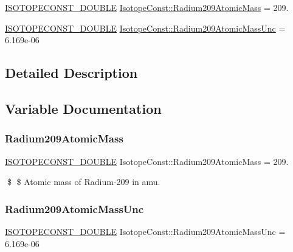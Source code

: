 \begin{DoxyCompactItemize}
\item 
\mbox{\hyperlink{group___isotope_const-_macros_ga8f45a7272ce02c0b4c65c44636ed719a}{I\+S\+O\+T\+O\+P\+E\+C\+O\+N\+S\+T\+\_\+\+D\+O\+U\+B\+LE}} \mbox{\hyperlink{group___isotope_const-_radium-_ra209_ga96427609bbf0950b8395b9c7e150998f}{Isotope\+Const\+::\+Radium209\+Atomic\+Mass}} = 209.
\item 
\mbox{\hyperlink{group___isotope_const-_macros_ga8f45a7272ce02c0b4c65c44636ed719a}{I\+S\+O\+T\+O\+P\+E\+C\+O\+N\+S\+T\+\_\+\+D\+O\+U\+B\+LE}} \mbox{\hyperlink{group___isotope_const-_radium-_ra209_ga82254cc10aeb89a8a78a88e9c717ce0a}{Isotope\+Const\+::\+Radium209\+Atomic\+Mass\+Unc}} = 6.\+169e-\/06
\end{DoxyCompactItemize}


\subsection{Detailed Description}


\subsection{Variable Documentation}
\mbox{\label{group___isotope_const-_radium-_ra209_ga96427609bbf0950b8395b9c7e150998f}} 
\subsubsection{\texorpdfstring{Radium209\+Atomic\+Mass}{Radium209AtomicMass}}
{\footnotesize\ttfamily \mbox{\hyperlink{group___isotope_const-_macros_ga8f45a7272ce02c0b4c65c44636ed719a}{I\+S\+O\+T\+O\+P\+E\+C\+O\+N\+S\+T\+\_\+\+D\+O\+U\+B\+LE}} Isotope\+Const\+::\+Radium209\+Atomic\+Mass = 209.}

\$ \$ Atomic mass of Radium-\/209 in amu. \mbox{\label{group___isotope_const-_radium-_ra209_ga82254cc10aeb89a8a78a88e9c717ce0a}} 
\subsubsection{\texorpdfstring{Radium209\+Atomic\+Mass\+Unc}{Radium209AtomicMassUnc}}
{\footnotesize\ttfamily \mbox{\hyperlink{group___isotope_const-_macros_ga8f45a7272ce02c0b4c65c44636ed719a}{I\+S\+O\+T\+O\+P\+E\+C\+O\+N\+S\+T\+\_\+\+D\+O\+U\+B\+LE}} Isotope\+Const\+::\+Radium209\+Atomic\+Mass\+Unc = 6.\+169e-\/06}

